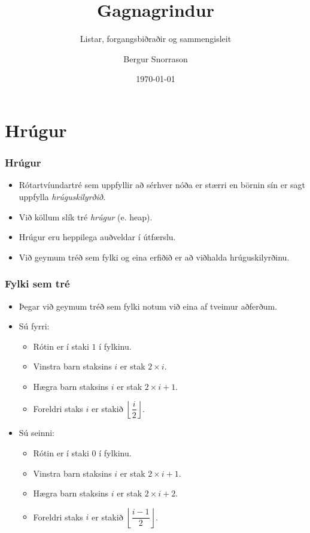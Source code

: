 \documentclass{beamer}
\title{Gagnagrindur}
\subtitle{Listar, forgangsbiðraðir og sammengisleit}
\author{Bergur Snorrason}
\date{\today}
\begin{document}
\frame{\titlepage}

\section[Hrúgur]{Hrúgur}

\begin{frame}
\frametitle{Hrúgur}
\begin{itemize}
	\item<1-> Rótartvíundartré sem uppfyllir að sérhver nóða er stærri en börnin sín er sagt uppfylla \emph{hrúguskilyrðið}.
	\item<2-> Við köllum slík tré \emph{hrúgur} (e. heap).
	\item<3-> Hrúgur eru heppilega auðveldar í útfærslu.
	\item<4-> Við geymum tréð sem fylki og eina erfiðið er að viðhalda hrúguskilyrðinu.
\end{itemize}
\end{frame}

\begin{frame}
\frametitle{Fylki sem tré}
\begin{itemize}
\item<1-> Þegar við geymum tréð sem fylki notum við eina af tveimur aðferðum.
\item<2-> Sú fyrri:
	\begin{itemize}
		\item<3-> Rótin er í staki $1$ í fylkinu.
		\item<4-> Vinstra barn staksins $i$ er stak $2\times i$.
		\item<5-> Hægra barn staksins $i$ er stak $2\times i + 1$.
		\item<6-> Foreldri staks $i$ er stakið $\left \lfloor \dfrac{i}{2} \right \rfloor$.
	\end{itemize}
\item<7-> Sú seinni:
	\begin{itemize}
		\item<8-> Rótin er í staki $0$ í fylkinu.
		\item<9-> Vinstra barn staksins $i$ er stak $2\times i + 1$.
		\item<10-> Hægra barn staksins $i$ er stak $2\times i + 2$.
		\item<11-> Foreldri staks $i$ er stakið $\left \lfloor \dfrac{i - 1}{2} \right \rfloor$.
	\end{itemize}
\end{itemize}
\end{frame}
\end{document}
